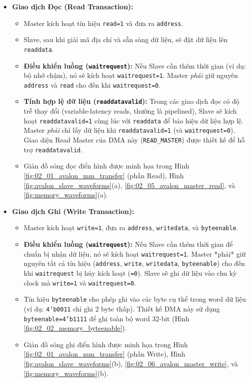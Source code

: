 \begin{itemize}
    \item \textbf{Giao dịch Đọc (Read Transaction):}
        \begin{itemize}
            \item Master kích hoạt tín hiệu \texttt{read=1} và đưa ra \texttt{address}.
            \item Slave, sau khi giải mã địa chỉ và sẵn sàng dữ liệu, sẽ đặt dữ liệu lên \texttt{readdata}.
            \item \textbf{Điều khiển luồng (\texttt{waitrequest}):} Nếu Slave cần thêm thời gian (ví dụ: bộ nhớ chậm), nó sẽ kích hoạt \texttt{waitrequest=1}. Master \textit{phải} giữ nguyên \texttt{address} và \texttt{read} cho đến khi \texttt{waitrequest=0}. 
            \item \textbf{Tính hợp lệ dữ liệu (\texttt{readdatavalid}):} Trong các giao dịch đọc có độ trễ thay đổi (variable-latency reads, thường là pipelined), Slave sẽ kích hoạt \texttt{readdatavalid=1} cùng lúc với \texttt{readdata} để báo hiệu dữ liệu hợp lệ. Master \textit{phải} chỉ lấy dữ liệu khi \texttt{readdatavalid=1} (và \texttt{waitrequest=0}). Giao diện Read Master của DMA này (\texttt{READ\_MASTER}) được thiết kế để hỗ trợ \texttt{readdatavalid}.
            \item Giản đồ sóng đọc điển hình được minh họa trong Hình \ref{fig:02_01_avalon_mm_transfer} (phần Read), Hình \ref{fig:avalon_slave_waveforms}(a), \ref{fig:02_05_avalon_master_read}, và \ref{fig:memory_waveforms}(a).
        \end{itemize}
    \item \textbf{Giao dịch Ghi (Write Transaction):}
        \begin{itemize}
            \item Master kích hoạt \texttt{write=1}, đưa ra \texttt{address}, \texttt{writedata}, và \texttt{byteenable}.
            \item \textbf{Điều khiển luồng (\texttt{waitrequest}):} Nếu Slave cần thêm thời gian để chuẩn bị nhận dữ liệu, nó sẽ kích hoạt \texttt{waitrequest=1}. Master *phải* giữ nguyên tất cả tín hiệu (\texttt{address}, \texttt{write}, \texttt{writedata}, \texttt{byteenable}) cho đến khi \texttt{waitrequest} bị hủy kích hoạt (\texttt{=0}). Slave sẽ ghi dữ liệu vào chu kỳ clock mà \texttt{write=1} và \texttt{waitrequest=0}.
            \item Tín hiệu \texttt{byteenable} cho phép ghi vào các byte cụ thể trong word dữ liệu (ví dụ: \texttt{4'b0011} chỉ ghi 2 byte thấp). Thiết kế DMA này sử dụng \texttt{byteenable=4'b1111} để ghi toàn bộ word 32-bit (Hình \ref{fig:02_02_memory_byteenable}).
            \item Giản đồ sóng ghi điển hình được minh họa trong Hình \ref{fig:02_01_avalon_mm_transfer} (phần Write), Hình \ref{fig:avalon_slave_waveforms}(b), \ref{fig:02_06_avalon_master_write}, và \ref{fig:memory_waveforms}(b).
        \end{itemize}
\end{itemize}

